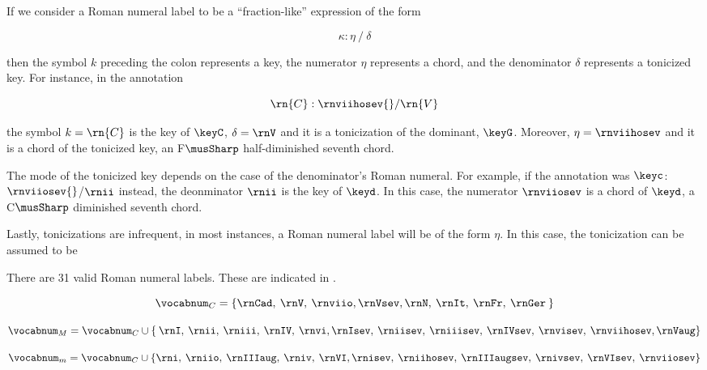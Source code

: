 
If we consider a Roman numeral label to be a
``fraction-like'' expression of the form

\begin{equation}
    \kappa : \eta \: / \: \delta
\end{equation}

then the symbol $k$ preceding the colon represents a key,
the numerator $\eta$ represents a chord, and the denominator
$\delta$ represents a tonicized key. For instance, in the
annotation 

\begin{equation}
    \rn{C}:\rnviihosev{}/\rn{V}
\end{equation}

the symbol $k=\rn{C}$ is the key of $\keyC$, $\delta = \rnV$
and it is a tonicization of the dominant, $\keyG$. Moreover,
$\eta=\rnviihosev$ and it is a chord of the tonicized key,
an F$\musSharp$ half-diminished seventh chord.

The mode of the tonicized key depends on the case of the
denominator's Roman numeral. For example, if the annotation
was $\keyc$:$\rnviiosev{}$/$\rnii$ instead, the deonminator
$\rnii$ is the key of $\keyd$. In this case, the numerator
$\rnviiosev$ is a chord of $\keyd$, a C$\musSharp$
diminished seventh chord.

Lastly, tonicizations are infrequent, in most instances, a
Roman numeral label will be of the form $\eta$. In this
case, the tonicization can be assumed to be 

There are 31 valid Roman numeral labels. These are indicated
in .



\begin{equation}
    \vocabnum_{C} = \{ \rnCad, \: \rnV, \: \rnviio,
    \rnVsev, \rnN, \: \rnIt, \: \rnFr, \: \rnGer \: \}
\end{equation}

\begin{equation}
    \vocabnum_{M} = \vocabnum_{C} \cup \{ \: \rnI, \: \rnii, \: 
    \rniii, \: \rnIV, \: \rnvi, \rnIsev, \: \rniisev, \: 
    \rniiisev, \: \rnIVsev, \: \rnvisev, \: \rnviihosev, \rnVaug \}
\end{equation}

\begin{equation}
    \vocabnum_{m} = \vocabnum_{C} \cup  \{ \rni, \: \rniio, \: 
    \rnIIIaug, \: \rniv, \: \rnVI, \rnisev, \: \rniihosev, \: 
    \rnIIIaugsev, \: \rnivsev, \: \rnVIsev, \: \rnviiosev \}
\end{equation}

